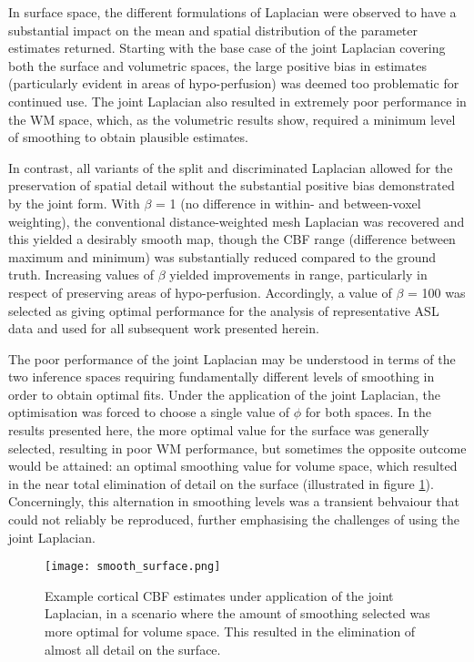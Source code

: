 In surface space, the different formulations of Laplacian were observed to have a substantial impact on the mean and spatial distribution of the parameter estimates returned. Starting with the base case of the joint Laplacian covering both the surface and volumetric spaces, the large positive bias in estimates (particularly evident in areas of hypo-perfusion) was deemed too problematic for continued use. The joint Laplacian also resulted in extremely poor performance in the WM space, which, as the volumetric results show, required a minimum level of smoothing to obtain plausible estimates. 

In contrast, all variants of the split and discriminated Laplacian allowed for the preservation of spatial detail without the substantial positive bias demonstrated by the joint form. With $\beta$ = 1 (no difference in within- and between-voxel weighting), the conventional distance-weighted mesh Laplacian was recovered and this yielded a desirably smooth map, though the CBF range (difference between maximum and minimum) was substantially reduced compared to the ground truth. Increasing values of $\beta$ yielded improvements in range, particularly in respect of preserving areas of hypo-perfusion. Accordingly, a value of $\beta$ = 100 was selected as giving optimal performance for the analysis of representative ASL data and used for all subsequent work presented herein. 

The poor performance of the joint Laplacian may be understood in terms of the two inference spaces requiring fundamentally different levels of smoothing in order to obtain optimal fits. Under the application of the joint Laplacian, the optimisation was forced to choose a single value of $\phi$ for both spaces. In the results presented here, the more optimal value for the surface was generally selected, resulting in poor WM performance, but sometimes the opposite outcome would be attained: an optimal smoothing value for volume space, which resulted in the near total elimination of detail on the surface (illustrated in figure \ref{smooth_surface}). Concerningly, this alternation in smoothing levels was a transient behvaiour that could not reliably be reproduced, further emphasising the challenges of using the joint Laplacian. 

\begin{figure}[H]
\centering
\texttt{[image: smooth\_surface.png]}
\caption{Example cortical CBF estimates under application of the joint Laplacian, in a scenario where the amount of smoothing selected was more optimal for volume space. This resulted in the elimination of almost all detail on the surface.}
\label{smooth_surface} 
\end{figure}

